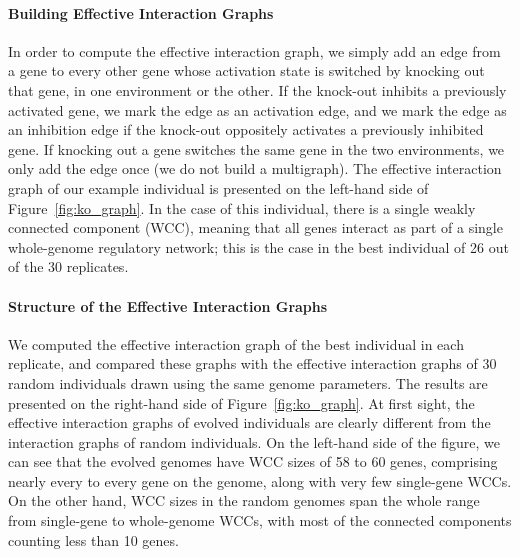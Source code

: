 \paragraph{Building Effective Interaction Graphs}
In order to compute the effective interaction graph, we simply add an edge from a gene to every other gene whose activation state is switched by knocking out that gene, in one environment or the other.
If the knock-out inhibits a previously activated gene, we mark the edge as an activation edge, and we mark the edge as an inhibition edge if the knock-out oppositely activates a previously inhibited gene.
If knocking out a gene switches the same gene in the two environments, we only add the edge once (we do not build a multigraph).
The effective interaction graph of our example individual is presented on the left-hand side of Figure~\ref{fig:ko_graph}.
In the case of this individual, there is a single weakly connected component (WCC), meaning that all genes interact as part of a single whole-genome regulatory network; this is the case in the best individual of 26 out of the 30 replicates.

\paragraph{Structure of the Effective Interaction Graphs}
We computed the effective interaction graph of the best individual in each replicate, and compared these graphs with the effective interaction graphs of 30 random individuals drawn using the same genome parameters.
The results are presented on the right-hand side of Figure~\ref{fig:ko_graph}.
At first sight, the effective interaction graphs of evolved individuals are clearly different from the interaction graphs of random individuals.
On the left-hand side of the figure, we can see that the evolved genomes have WCC sizes of 58 to 60 genes, comprising nearly every to every gene on the genome, along with very few single-gene WCCs.
On the other hand, WCC sizes in the random genomes span the whole range from single-gene to whole-genome WCCs, with most of the connected components counting less than 10 genes.

